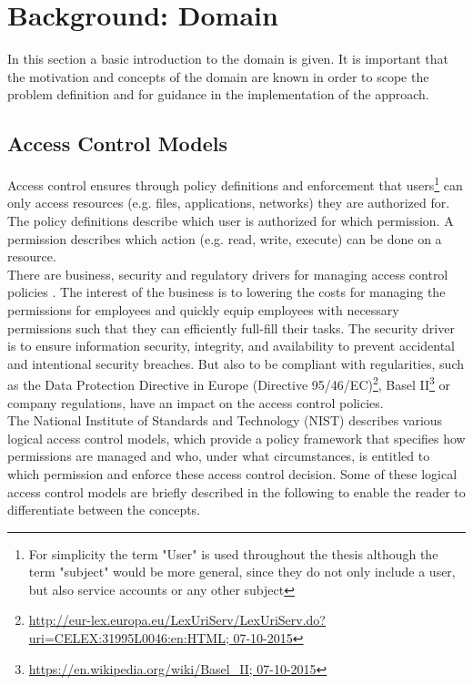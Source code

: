 \newpage
\section{Background: Domain}
In this section a basic introduction to the domain is given. It is important that the motivation and concepts of the domain are known in order to scope the problem definition and for guidance in the implementation of the approach.

    \subsection{Access Control Models}
    Access control ensures through policy definitions and enforcement that users\footnote{For simplicity the term "User" is used throughout the thesis although the term "subject" would be more general, since they do not only include a user, but also service accounts or any other subject} can only access resources (e.g. files, applications, networks) they are authorized for. The policy definitions describe which user is authorized for which permission. A permission describes which action (e.g. read, write, execute) can be done on a resource.\\
    There are business, security and regulatory drivers for managing access control policies \cite{o20102010}. The interest of the business is to lowering the costs for managing the permissions for employees and quickly equip employees with necessary permissions such that they can efficiently full-fill their tasks. The security driver is to ensure information security, integrity, and availability to prevent accidental and intentional security breaches. But also to be compliant with regularities, such as the Data Protection Directive in Europe (Directive 95/46/EC)\footnote{\url{http://eur-lex.europa.eu/LexUriServ/LexUriServ.do?uri=CELEX:31995L0046:en:HTML; 07-10-2015}}, Basel II\footnote{\url{https://en.wikipedia.org/wiki/Basel_II; 07-10-2015}} or company regulations, have an impact on the access control policies.\\
    The National Institute of Standards and Technology (NIST) \cite{Hu13guideto} describes various logical access control models, which provide a policy framework that specifies how permissions are managed and who, under what circumstances, is entitled to which permission and enforce these access control decision. Some of these logical access control models are briefly described in the following to enable the reader to differentiate between the concepts.
    \iffalse There is no consensus on the terms access control models, mechanisms and techniques. In this thesis an access control policy model describes a policy framework that specifies how permissions are managed and who, under what circumstances, is entitled to which permission on a high-level. There are different Access Control Policy Models which come with different advantages and disadvantages. Some of these models are briefly described in the following to enable the reader to differentiate between the concepts. \fi
